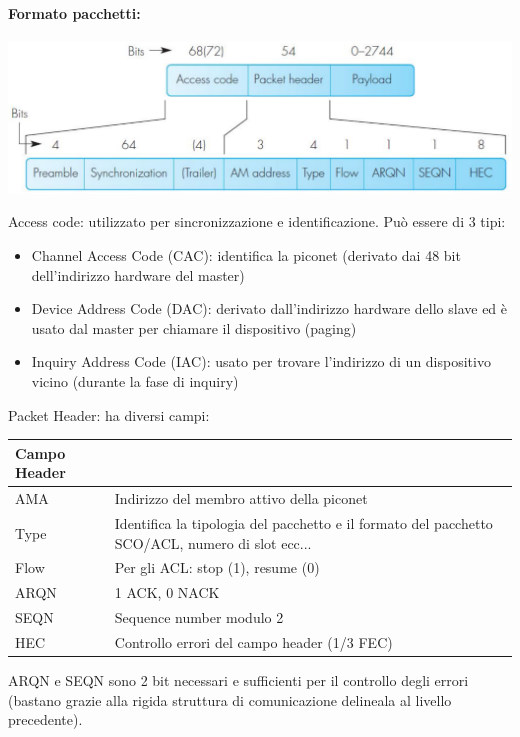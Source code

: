\paragraph{Formato pacchetti:} 
\begin{center}
	\includegraphics[width=0.9\linewidth]{img/wpan/basebandpacket}
\end{center}
Access code: utilizzato per sincronizzazione e identificazione. Può essere di 3 tipi:
\begin{itemize}
	\item Channel Access Code (CAC): identifica la piconet (derivato dai 48 bit dell'indirizzo hardware del master)
	\item Device Address Code (DAC): derivato dall'indirizzo hardware dello slave ed è usato dal master per chiamare il dispositivo (paging)
	\item Inquiry Address Code (IAC): usato per trovare l'indirizzo di un dispositivo vicino (durante la fase di inquiry)
\end{itemize}

Packet Header: ha diversi campi: 
\begin{center}
	    \begin{tabular}{|l|p{10cm}|}
		\hline
		\textbf{Campo Header} & \\ \hline
		AMA & Indirizzo del membro attivo della piconet \\ \hline
		Type & Identifica la tipologia del pacchetto e il formato del pacchetto SCO/ACL, numero di slot ecc... \\ \hline
		Flow & Per gli ACL: stop (1), resume (0) \\ \hline
		ARQN & 1 ACK, 0 NACK \\ \hline
		SEQN & Sequence number modulo 2 \\ \hline
		HEC & Controllo errori del campo header (1/3 FEC) \\ \hline
	\end{tabular}
\end{center}
ARQN e SEQN sono 2 bit necessari e sufficienti per il controllo degli errori (bastano grazie alla rigida struttura di comunicazione delineala al livello precedente).

